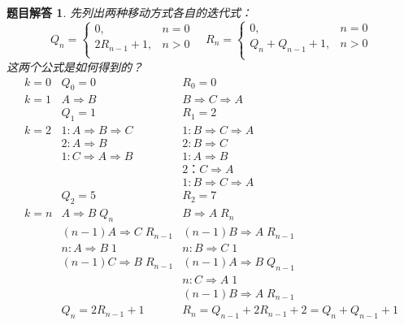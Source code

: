 \documentclass[mode=geye, chinesefont=founder]{elegantnote}
\newtheorem{answer}{题目解答}
\begin{document}
\begin{answer}
	先列出两种移动方式各自的迭代式：
	\begin{equation*}
		Q_{n} = \left\{
		\begin{array}{ll}
			0 ,& n = 0 \\
			2R_{n-1}+1 ,& n>0\\
		\end{array}
		\right. \quad
		R_{n} = \left\{
		\begin{array}{ll}
			0 ,& n = 0 \\
			Q_{n}+Q_{n-1}+1 ,& n>0\\
		\end{array}
		\right.
	\end{equation*}
	这两个公式是如何得到的？
	\begin{equation*}
		\begin{array}{lll}
			k=0 & Q_{0} = 0		 					& R_{0} = 0 \\
			k=1 & A \Rightarrow B	 				& B \Rightarrow C \Rightarrow A \\
				& Q_1=1 							& R_1 = 2\\
			k=2 & 1: A \Rightarrow B \Rightarrow C 	& 1: B \Rightarrow C \Rightarrow A \\
				& 2: A \Rightarrow B 				& 2: B \Rightarrow C \\
				& 1: C \Rightarrow A \Rightarrow B  & 1: A \Rightarrow B \\
				& 									& 2：C \Rightarrow A \\
				&									& 1: B \Rightarrow C \Rightarrow A \\
				& Q_{2} = 5							& R_{2} = 7 \\
			k=n & A \Rightarrow B	\; Q_n			& B \Rightarrow A\; R_n\\
				& (n-1) A \Rightarrow C	\;R_{n-1}	& (n-1) B \Rightarrow A \; R_{n-1} \\
				& n: A \Rightarrow B	\;1			& n: B \Rightarrow C 	\; 1 \\
				& (n-1) C \Rightarrow B \;R_{n-1}	& (n-1) A \Rightarrow B \; Q_{n-1} \\
				& 									& n: C \Rightarrow A 	\; 1 \\
				& 									& (n-1) B \Rightarrow A \; R_{n-1} \\
				& Q_n = 2R_{n-1}+1					& R_{n} = Q_{n-1}+2R_{n-1}+2 = Q_{n}+Q_{n-1}+1\\
		\end{array}
	\end{equation*}
\end{answer}
\end{document}
